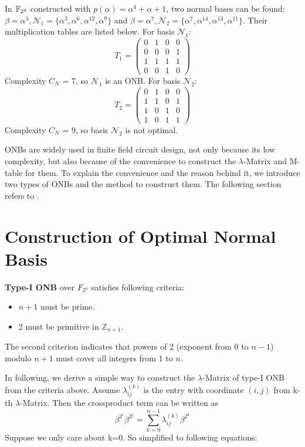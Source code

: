 \begin{Example}
\label{ex:app4}
In ${\mathbb{F}}_{2^4}$ constructed with $p(\alpha) = \alpha^4 + \alpha + 1$, two normal bases can be found:
$\beta = \alpha^3, \mathcal N_1 = \{ \alpha^3, \alpha^6, \alpha^{12}, \alpha^9\}$ and 
$\beta = \alpha^7, \mathcal N_2 = \{\alpha^7, \alpha^{14}, \alpha^{13}, \alpha^{11}\}$. 
Their multiplication tables are listed below. For basis $\mathcal N_1$:
\begin{equation}
T_1 = \left(
\begin{array}{lccr}
0 & 1 & 0 & 0\\
0 & 0 & 0 & 1\\
1 & 1 & 1 & 1\\
0 & 0 & 1 & 0
\end{array} \right)
\end{equation}
Complexity $C_N$ = 7, so $\mathcal N_1$ is an ONB. For basis $\mathcal N_2$:
\begin{equation}
T_2 = \left(
\begin{array}{lccr}
0 & 1 & 0 & 0\\
1 & 1 & 0 & 1\\
1 & 0 & 1 & 0\\
1 & 0 & 1 & 1
\end{array} \right)
\end{equation}
Complexity $C_N$ = 9, so basis $\mathcal N_2$ is not optimal.
\end{Example}

ONBs are widely used in finite field circuit design, not only because its low complexity, 
but also because of the convenience to construct the $\lambda$-Matrix and M-table for them. 
To explain the convenience and the reason behind it, we introduce two types of ONBs and the method 
to construct them.
The following section refers to \cite{rosingbook}.
\section{Construction of Optimal Normal Basis}
{\bf Type-I ONB} over $F_{2^n}$ satisfies following criteria:
\begin{itemize}
\item $n+1$ must be prime.
\item 2 must be primitive in $\mathbb{Z}_{n+1}$.
\end{itemize}
The second criterion indicates that powers of 2 (exponent from 0 to $n-1$) modulo $n+1$ must cover all integers
from 1 to $n$.

In following, we derive a simple way to construct the $\lambda$-Matrix of type-I ONB 
from the criteria above. 
Assume $\lambda_{ij}^{(k)}$ is the entry with coordinate $(i,j)$ from k-th $\lambda$-Matrix. Then the crossproduct
term can be written as
\begin{equation}
\beta^{2^i}\beta^{2^j} = \sum_{k=0}^{n-1} \lambda_{ij}^{(k)} \beta^{2^k}
\end{equation}
Suppose we only care about k=0. So simplified to following equations:

